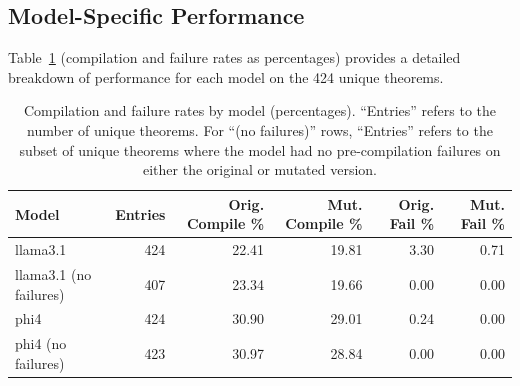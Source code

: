 \subsection{Model-Specific Performance}
\label{sec:results_model_specific}

Table~\ref{tab:kpi-percentages} (compilation and failure rates as percentages) provides a detailed breakdown of performance for each model on the 424 unique theorems.

\begin{table}[h]
\centering
\begin{tabular}{|l|r|r|r|r|r|}
\hline
\textbf{Model} & \textbf{Entries} & \textbf{Orig. Compile \%} & \textbf{Mut. Compile \%} & \textbf{Orig. Fail \%} & \textbf{Mut. Fail \%} \\
\hline
llama3.1 & 424 & 22.41 & 19.81 & 3.30 & 0.71 \\
llama3.1 (no failures) & 407& 23.34 & 19.66 & 0.00 & 0.00 \\
\hline
phi4 & 424 & 30.90 & 29.01 & 0.24 & 0.00 \\
phi4 (no failures) & 423 & 30.97 & 28.84 & 0.00 & 0.00 \\
\hline
\end{tabular}
\caption{Compilation and failure rates by model (percentages). ``Entries'' refers to the number of unique theorems. For ``(no failures)'' rows, ``Entries'' refers to the subset of unique theorems where the model had no pre-compilation failures on either the original or mutated version.}
\label{tab:kpi-percentages}
\end{table}


